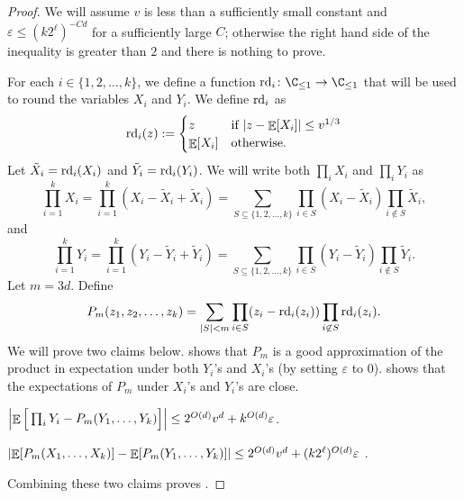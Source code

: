 \documentclass{toc}
\def\eps{\varepsilon}
\def\Blocklength{\ell}
\def\rd{\textnormal{rd}}
\DeclarePairedDelimiter{\abs}{\lvert}{\rvert}
\DeclareMathOperator*{\E}{\mathbb{E}}                 %
\begin{document}
  \begin{proof}
    We will assume $v$ is less than a sufficiently small constant and $\eps \le (k 2^\Blocklength)^{-Cd}$ for a sufficiently large $C$; otherwise the right hand side of the inequality is greater than $2$ and there is nothing to prove.

    \medskip

    For each $i \in \{1, 2, \ldots, k\}$, we define a function $\rd_i \colon \C_{\le 1} \to \C_{\le 1}$ that will be used to round the variables $X_i$ and $Y_i$.
    We define $\rd_i$ as
    \[ \rd_i(z) :=
      \begin{cases}
        z & \text{if $\abs{z - \E[X_i]} \le v^{1/3}$} \\
        \E[X_i] & \text{otherwise.}
      \end{cases}
    \]
    Let $\tilde X_i = \rd_i(X_i)$ and $\tilde Y_i = \rd_i(Y_i)$.
    We will write both $\prod_i X_i$ and $\prod_i Y_i$ as
    \[
      \prod_{i = 1}^k X_i
      = \prod_{i = 1}^k (X_i - \tilde X_i + \tilde X_i)
      = \sum_{ S \subseteq \{1, 2, \ldots, k\} } \prod_{i \in S} (X_i - \tilde X_i) \prod_{i \not\in S} \tilde X_i ,
    \]
    and
    \[
      \prod_{i = 1}^k Y_i
      = \prod_{i = 1}^k (Y_i - \tilde Y_i + \tilde Y_i)
      = \sum_{ S \subseteq \{1, 2, \ldots, k\} } \prod_{i \in S} (Y_i - \tilde Y_i) \prod_{i \not\in S} \tilde Y_i .
    \]
    Let $m = 3d$.
    Define
    \[
      P_m(z_1, z_2, \ldots, z_k)
      = \sum_{\abs{S} < m} \prod_{i \in S} (z_i - \rd_i(z_i)) \prod_{i \not\in S} \rd_i(z_i).
    \]
    We will prove two claims below.
     shows that $P_m$ is a good approximation of the product in expectation under both $Y_i$'s and $X_i$'s (by setting $\eps$ to $0$).
     shows that the expectations of $P_m$ under $X_i$'s and $Y_i$'s are close.

    \begin{claim} \label{claim:Pm-good-approx}
      $\abs*{ \E \Big[ \prod_i Y_i - P_m(Y_1, \ldots, Y_k) \Big] }
      \le 2^{O(d)} v^d + k^{O(d)} \eps$.
    \end{claim}

    \begin{claim} \label{claim:closeness-Pm}
      $\abs{ \E[P_m(X_1, \ldots, X_k)] - \E[P_m(Y_1, \ldots, Y_k)] } \le 2^{O(d)} v^d + (k 2^\ell)^{O(d)} \eps$ .
    \end{claim}

    Combining these two claims proves .
  \end{proof}
\end{document}
